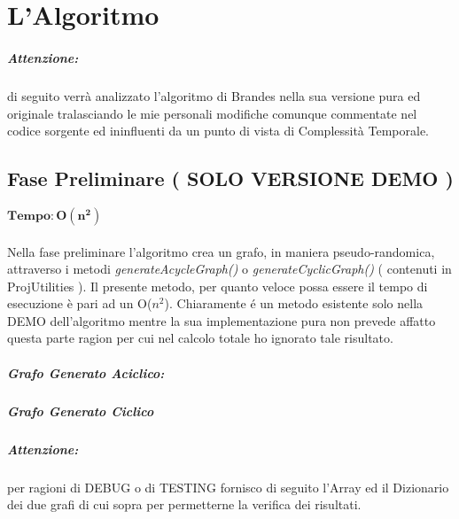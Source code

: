 \chapter{L'Algoritmo}
\paragraph{Attenzione:} di seguito verrà analizzato l'algoritmo di Brandes nella sua versione pura ed originale tralasciando le mie personali modifiche comunque commentate nel codice sorgente ed ininfluenti da un punto di vista di Complessità Temporale.

\section{Fase Preliminare ( SOLO VERSIONE DEMO )}
$\mathbf{Tempo: O(n^2)}$\\ 	\\
Nella fase preliminare l'algoritmo crea un grafo, in maniera pseudo-randomica, attraverso i metodi \emph{generateAcycleGraph()} o  \emph{generateCyclicGraph()} ( contenuti in ProjUtilities ).
Il presente metodo, per quanto veloce possa essere il tempo di esecuzione è pari ad un O($n^2$). Chiaramente \'e un metodo esistente solo nella DEMO dell'algoritmo mentre la sua implementazione pura non prevede affatto questa parte ragion per cui nel calcolo totale ho ignorato tale risultato.
\newline
\newline

\paragraph{Grafo Generato Aciclico:}


\paragraph{\newline Grafo Generato Ciclico \newline}


\paragraph{Attenzione:} per ragioni di DEBUG o di TESTING fornisco di seguito l'Array ed il Dizionario dei due grafi di cui sopra per permetterne la verifica dei risultati. \newline \newline


